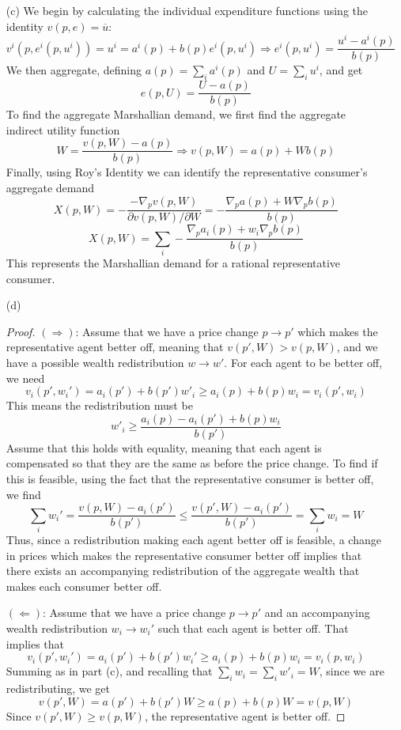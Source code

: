 \documentclass[12pt]{article}
\begin{document}
\begin{itemize}
    \item[(c)] We begin by calculating the individual expenditure functions using the identity $v(p,e) = \overline{u}$:
    \[
    v^i(p,e^i(p,u^i)) = u^i = a^i(p) + b(p)e^i(p,u^i) \Longrightarrow e^i(p,u^i) = \frac{u^i - a^i(p)}{b(p)}
    \]
    We then aggregate, defining $a(p) = \sum_i a^i(p)$ and $U = \sum_i u^i$, and get
    \[
    e(p,U) = \frac{U - a(p)}{b(p)}
    \]
    To find the aggregate Marshallian demand, we first find the aggregate indirect utility function
    \[
    W = \frac{v(p,W) - a(p)}{b(p)} \Longrightarrow v(p,W) = a(p) + Wb(p)
    \]
    Finally, using Roy's Identity we can identify the representative consumer's aggregate demand
    \[
    X(p,W) = -\frac{-\nabla_p v(p,W)}{\partial v(p,W) / \partial W} = -\frac{\nabla_p a(p) + W\nabla_p b(p)}{b(p)} 
    \]
    \[
    X(p,W) = \sum_i -\frac{\nabla_p a_i(p) + w_i\nabla_p b(p)}{b(p)}
    \]
    This represents the Marshallian demand for a rational representative consumer.

    \item[(d)] 

    \begin{proof}
        $(\Rightarrow)$: Assume that we have a price change $p \to p'$ which makes the representative agent better off, meaning that $v(p',W) > v(p,W)$, and we have a possible wealth redistribution $w \to w'$. For each agent to be better off, we need
        \[
        v_i(p',w_i') = a_i(p') + b(p')w'_i \ge a_i(p) + b(p)w_i = v_i(p',w_i)
        \]
        This means the redistribution must be
        \[
        w'_i \ge \frac{a_i(p) - a_i(p') + b(p)w_i}{b(p')}
        \]
        Assume that this holds with equality, meaning that each agent is compensated so that they are the same as before the price change. To find if this is feasible, using the fact that the representative consumer is better off, we find
        \[
        \sum_i w_i' = \frac{v(p,W) - a_i(p')}{b(p')} \le \frac{v(p',W) - a_i(p')}{b(p')} = \sum_i w_i = W
        \]
        Thus, since a redistribution making each agent better off is feasible, a change in prices which makes the representative consumer better off implies that there exists an accompanying redistribution of the aggregate wealth that makes each consumer better off.

        \medskip

        $(\Leftarrow)$: Assume that we have a price change $p \to p'$ and an accompanying wealth redistribution $w_i \to w_i'$ such that each agent is better off. That implies that 
        \[
        v_i(p',w_i') = a_i(p') + b(p')w_i' \ge a_i(p) + b(p)w_i = v_i(p,w_i)
        \]
        Summing as in part (c), and recalling that $\sum_i w_i = \sum_i w'_i = W$, since we are redistributing, we get
        \[
        v(p',W) = a(p') + b(p')W \ge a(p) + b(p)W = v(p,W)
        \]
        Since $v(p',W) \ge v(p,W)$, the representative agent is better off.
    \end{proof}

    
\end{itemize}
\end{document}
